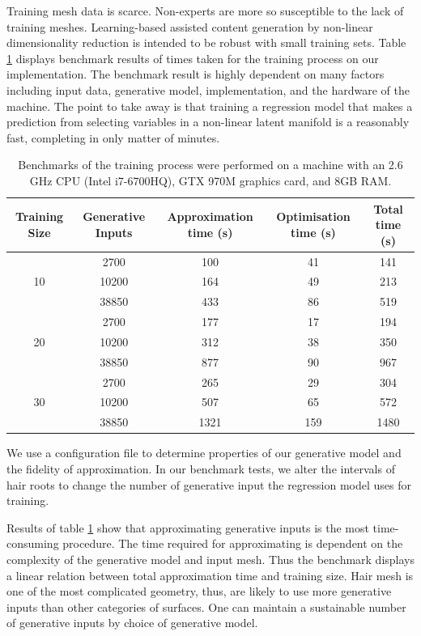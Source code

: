 \documentclass[ %
author={Dillon Keith Diep},
supervisor={Dr. Carl Henrik Ek},
degree={MEng},
title={ART-CG Hair:},
subtitle={Assisted Real-time Content Generation of Stylised Virtual Hair},
type={Research},
year={2017} ]{dissertation}
\begin{document}
Training mesh data is scarce. Non-experts are more so susceptible to the lack of training meshes. Learning-based assisted content generation by non-linear dimensionality reduction is intended to be robust with small training sets. Table \ref{trainingbenchmarks} displays benchmark results of times taken for the training process on our implementation. The benchmark result is highly dependent on many factors including input data, generative model, implementation, and the hardware of the machine. The point to take away is that training a regression model that makes a prediction from selecting variables in a non-linear latent manifold is a reasonably fast, completing in only matter of minutes.

\begin{table}[!h]
	\centering
	\begin{tabular}{|c|c|c|c|c|}
		\hline
		Training Size & Generative Inputs &	Approximation time (s)	& Optimisation time (s)	&	Total time (s)\\
		\hline
		\multirow{3}{*}{10}
		& 2700 	& 100	    & 41     	& 141\\
		& 10200 & 164	    & 49		& 213\\
		& 38850 & 433      	& 86      	& 519\\
		\hline
		\multirow{3}{*}{20}
		& 2700 	& 177      	& 17        & 194\\
		& 10200 & 312      	& 38      	& 350\\
		& 38850 & 877		& 90	    & 967\\
		\hline
		\multirow{3}{*}{30}
		& 2700 	& 265      	& 29      	& 304\\
		& 10200 & 507      	& 65      	& 572\\
		& 38850 & 1321      & 159      	& 1480\\
		\hline
	\end{tabular}
	\caption{Benchmarks of the training process were performed on a machine with an 2.6 GHz CPU (Intel i7-6700HQ), GTX 970M graphics card, and 8GB RAM. }
	\label{trainingbenchmarks}
\end{table}

We use a configuration file to determine properties of our generative model and the fidelity of approximation. In our benchmark tests, we alter the intervals of hair roots to change the number of generative input the regression model uses for training.

Results of table \ref{trainingbenchmarks} show that approximating generative inputs is the most time-consuming procedure. The time required for approximating is dependent on the complexity of the generative model and input mesh. Thus the benchmark displays a linear relation between total approximation time and training size. Hair mesh is one of the most complicated geometry, thus, are likely to use more generative inputs than other categories of surfaces. One can maintain a sustainable number of generative inputs by choice of generative model.
\end{document}
